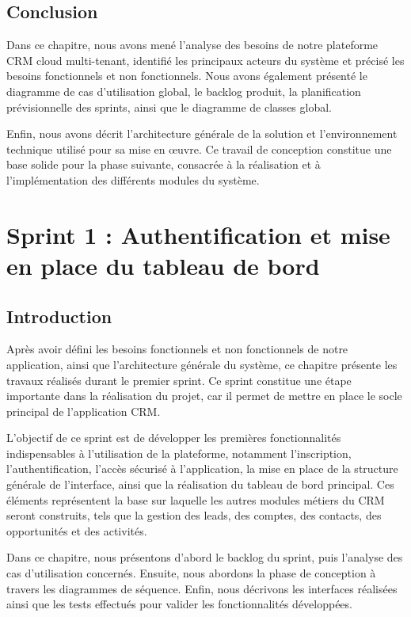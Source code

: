 \documentclass[12pt,a4paper]{report}
\begin{document}
\section*{Conclusion}

Dans ce chapitre, nous avons mené l’analyse des besoins de notre plateforme CRM cloud multi-tenant, identifié les principaux acteurs du système et précisé les besoins fonctionnels et non fonctionnels. Nous avons également présenté le diagramme de cas d’utilisation global, le backlog produit, la planification prévisionnelle des sprints, ainsi que le diagramme de classes global.

Enfin, nous avons décrit l’architecture générale de la solution et l’environnement technique utilisé pour sa mise en œuvre. Ce travail de conception constitue une base solide pour la phase suivante, consacrée à la réalisation et à l’implémentation des différents modules du système.
\chapter{Sprint 1 : Authentification et mise en place du tableau de bord}

\section*{Introduction}

Après avoir défini les besoins fonctionnels et non fonctionnels de notre application, ainsi que l’architecture générale du système, ce chapitre présente les travaux réalisés durant le premier sprint. Ce sprint constitue une étape importante dans la réalisation du projet, car il permet de mettre en place le socle principal de l’application CRM.

L’objectif de ce sprint est de développer les premières fonctionnalités indispensables à l’utilisation de la plateforme, notamment l’inscription, l’authentification, l’accès sécurisé à l’application, la mise en place de la structure générale de l’interface, ainsi que la réalisation du tableau de bord principal. Ces éléments représentent la base sur laquelle les autres modules métiers du CRM seront construits, tels que la gestion des leads, des comptes, des contacts, des opportunités et des activités.

Dans ce chapitre, nous présentons d’abord le backlog du sprint, puis l’analyse des cas d’utilisation concernés. Ensuite, nous abordons la phase de conception à travers les diagrammes de séquence. Enfin, nous décrivons les interfaces réalisées ainsi que les tests effectués pour valider les fonctionnalités développées.
\end{document}
